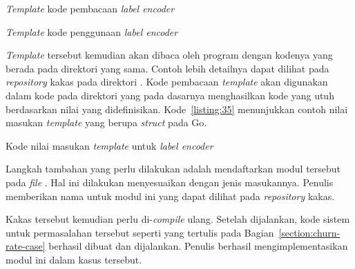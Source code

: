 \begin{code}
	\caption{\textit{Template} kode pembacaan \textit{label encoder}}\label{listing:33}
\end{code}

\begin{code}
	\caption{\textit{Template} kode penggunaan \textit{label encoder}}\label{listing:34}
\end{code}

\textit{Template} tersebut kemudian akan dibaca oleh program dengan kodenya yang berada pada direktori yang sama.
Contoh lebih detailnya dapat dilihat pada \textit{repository} kakas pada direktori .
Kode pembacaan \textit{template} akan digunakan dalam kode pada direktori  yang pada dasarnya menghasilkan kode yang utuh berdasarkan nilai yang didefinisikan.
Kode~\ref{listing:35} menunjukkan contoh nilai masukan \textit{template} yang berupa \textit{struct} pada Go.

\begin{code}
	\caption{Kode nilai masukan \textit{template} untuk \textit{label encoder}}\label{listing:35}
\end{code}

Langkah tambahan yang perlu dilakukan adalah mendaftarkan modul tersebut pada \textit{file} .
Hal ini dilakukan menyesuaikan dengan jenis masukannya.
Penulis memberikan nama  untuk modul ini yang dapat dilihat pada \textit{repository} kakas.

Kakas tersebut kemudian perlu di-\textit{compile} ulang.
Setelah dijalankan, kode sistem untuk permasalahan tersebut seperti yang tertulis pada Bagian~\ref{section:churn-rate-case} berhasil dibuat dan dijalankan.
Penulis berhasil mengimplementasikan modul ini dalam kasus tersebut.
